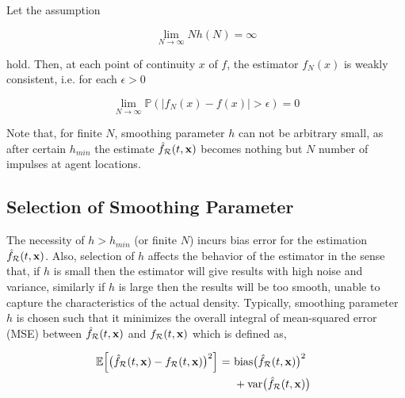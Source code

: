 \documentclass{ifacconf}
\newcommand{\Rconf}{{\mathcal R}}
\newcommand{\bx}{{\bf x}}
\begin{document}
\begin{thm} \label{thm: probabilisticConvergence}
	Let the assumption
	
	\begin{equation*}
		\lim_{N \rightarrow \infty} N h(N) = \infty
	\end{equation*}
	
	hold. Then, at each point of continuity $x$ of $f$, the estimator $f_N(x)$ is weakly consistent, i.e. for each $\epsilon > 0$
	
	\begin{equation}
		\lim_{N \rightarrow \infty} \mathbb{P} (|f_N(x) - f(x)| > \epsilon) = 0
	\end{equation}
\end{thm}

%
Note that, for finite $N$, smoothing parameter $h$ can not be arbitrary small, as after certain $h_{min}$ the estimate $\hat{f}_\Rconf(t,\bx)$ becomes nothing but $N$ number of impulses at agent locations. 

\subsection{Selection of Smoothing Parameter}
The necessity of $ h > h_{min}$ (or finite $N$) incurs bias error for the estimation $\hat{f}_\Rconf (t,\bx)$. Also, selection of $h$ affects the behavior of the estimator in the sense that, if $h$ is small then the estimator will give results with high noise and variance, similarly if $h$ is large then the results will be too smooth, unable to capture the characteristics of the actual density. Typically, smoothing parameter $h$ is   chosen such that it minimizes the overall integral of mean-squared error (MSE) between $\hat{f}_\Rconf (t,\bx)$ and $f_\Rconf(t,\bx)$ which is defined as,

\begin{align} \label{eqn: biasVarTrade}
	\begin{split}
	\hspace{-0.17cm}\mathbb{E}\Big[\big(\hat{f}_\Rconf(t,\bx) - f_\Rconf(t,\bx) \big)^2 \Big] \hspace{-0.1cm} \ = \ & \textnormal{bias}\big(\hat{f}_\Rconf(t,\bx)\big)^2 \hspace{-0.05cm} \\ &+ \textnormal{var}\big(\hat{f}_\Rconf(t,\bx)\big)
	\end{split}
\end{align}
\end{document}
